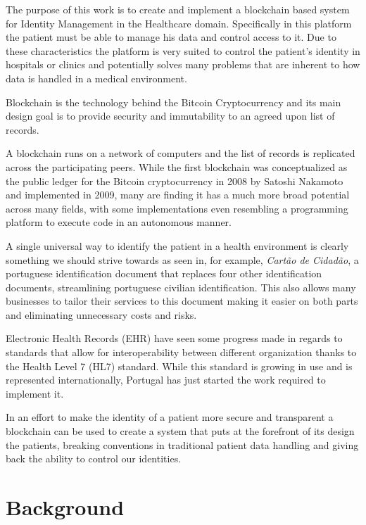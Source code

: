 \documentclass[notitlepage]{llncs}
\begin{document}
The purpose of this work is to create and implement a blockchain based system for Identity Management in the Healthcare domain. Specifically in this platform the patient must be able to manage his data and control access to it. Due to these characteristics the platform is very suited to control the patient’s identity in hospitals or clinics and potentially solves many problems that are inherent to how data is handled in a medical environment.
\par
Blockchain is the technology behind the Bitcoin Cryptocurrency and its main design goal is to provide security and immutability to an agreed upon list of records.
\par
A blockchain runs on a network of computers and the list of records is replicated across the participating peers. While the first blockchain was conceptualized as the public ledger for the Bitcoin cryptocurrency in 2008 by Satoshi Nakamoto and implemented in 2009, many are finding it has a much more broad potential across many fields, with some implementations even resembling a programming platform to execute code in an autonomous manner.
\par
A single universal way to identify the patient in a health environment is clearly something we should strive towards as seen in, for example, \textit{Cartão de Cidadão}, a portuguese identification document that replaces four other identification documents, streamlining portuguese civilian identification. This also allows many businesses to tailor their services to this document making it easier on both parts and eliminating unnecessary costs and risks.
\par
Electronic Health Records (EHR) have seen some progress made in regards to standards that allow for interoperability between different organization thanks to the Health Level 7 (HL7) standard. While this standard is growing in use and is represented internationally, Portugal has just started the work required to implement it.	
\par
In an effort to make the identity of a patient more secure and transparent a blockchain can be used to create a system that puts at the forefront of its design the patients, breaking conventions in traditional patient data handling and giving back the ability to control our identities.



\section{Background}
\end{document}
